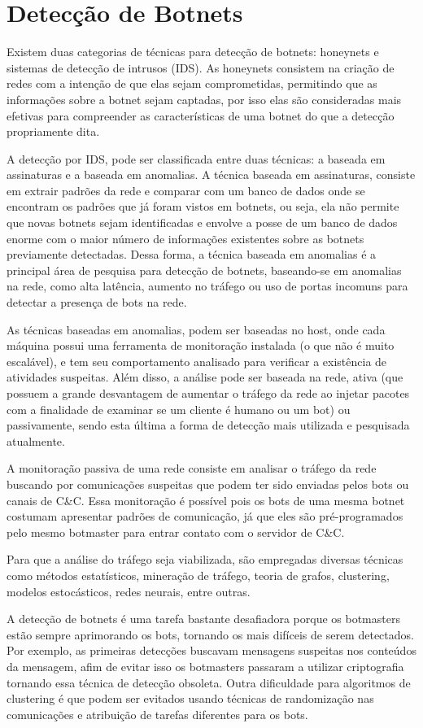 \section{Detecção de Botnets}

Existem duas categorias de técnicas para detecção de botnets: honeynets e sistemas de detecção de intrusos (IDS). As honeynets consistem na criação de redes com a intenção de que elas sejam comprometidas, permitindo que as informações sobre a botnet sejam captadas, por isso elas são consideradas mais efetivas para compreender as características de uma botnet do que a detecção propriamente dita.

A detecção por IDS, pode ser classificada entre duas técnicas: a baseada em assinaturas e a baseada em anomalias. A técnica baseada em assinaturas, consiste em extrair padrões da rede e comparar com um banco de dados onde se encontram os padrões que já foram vistos em botnets, ou seja, ela não permite que novas botnets sejam identificadas e envolve a posse de um banco de dados enorme com o maior número de informações existentes sobre as botnets previamente detectadas. Dessa forma, a técnica baseada em anomalias é a principal área de pesquisa para detecção de botnets, baseando-se em anomalias na rede, como alta latência, aumento no tráfego ou uso de portas incomuns para detectar a presença de bots na rede.

As técnicas baseadas em anomalias, podem ser baseadas no host, onde cada máquina possui uma ferramenta de monitoração instalada (o que não é muito escalável), e tem seu comportamento analisado para verificar a existência de atividades suspeitas. Além disso, a análise pode ser baseada na rede, ativa (que possuem a grande desvantagem de aumentar o tráfego da rede ao injetar pacotes com a finalidade de examinar se um cliente é humano ou um bot) ou passivamente, sendo esta última a forma de detecção mais utilizada e pesquisada atualmente.

A monitoração passiva de uma rede consiste em analisar o tráfego da rede buscando por comunicações suspeitas que podem ter sido enviadas pelos bots ou canais de C\&C. Essa monitoração é possível pois os bots de uma mesma botnet costumam apresentar padrões de comunicação, já que eles são pré-programados pelo mesmo botmaster para entrar contato com o servidor de C\&C.

Para que a análise do tráfego seja viabilizada, são empregadas diversas técnicas como métodos estatísticos, mineração de tráfego, teoria de grafos, clustering, modelos estocásticos, redes neurais, entre outras.

A detecção de botnets é uma tarefa bastante desafiadora porque os botmasters estão sempre aprimorando os bots, tornando os mais difíceis de serem detectados. Por exemplo, as primeiras detecções buscavam mensagens suspeitas nos conteúdos da mensagem, afim de evitar isso os botmasters passaram a utilizar criptografia tornando essa técnica de detecção obsoleta. Outra dificuldade para algoritmos de clustering é que podem ser evitados usando técnicas de randomização nas comunicações e atribuição de tarefas diferentes para os bots.
